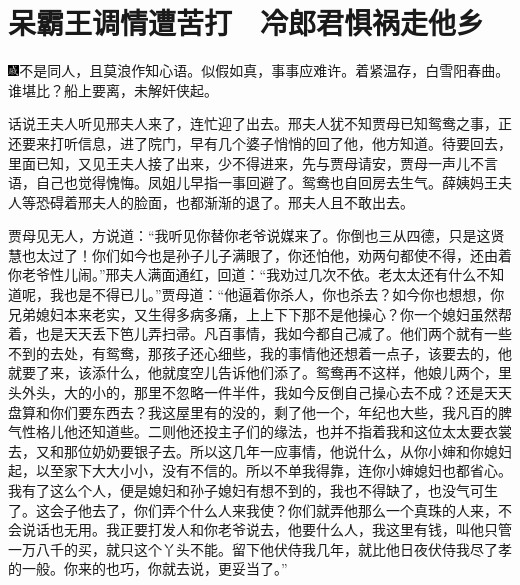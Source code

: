 

\chapter{呆霸王调情遭苦打　冷郎君惧祸走他乡}

{\includegraphics[width=3mm]{../Images/00005}不是同人，且莫浪作知心语。似假如真，事事应难许。着紧温存，白雪阳春曲。谁堪比？船上要离，未解奸侠起。}

话说王夫人听见邢夫人来了，连忙迎了出去。邢夫人犹不知贾母已知鸳鸯之事，正还要来打听信息，进了院门，早有几个婆子悄悄的回了他，他方知道。待要回去，里面已知，又见王夫人接了出来，少不得进来，先与贾母请安，贾母一声儿不言语，自己也觉得愧悔。凤姐儿早指一事回避了。鸳鸯也自回房去生气。薛姨妈王夫人等恐碍着邢夫人的脸面，也都渐渐的退了。邢夫人且不敢出去。

贾母见无人，方说道：``我听见你替你老爷说媒来了。你倒也三从四德，只是这贤慧也太过了！你们如今也是孙子儿子满眼了，你还怕他，劝两句都使不得，还由着你老爷性儿闹。''邢夫人满面通红，回道：``我劝过几次不依。老太太还有什么不知道呢，我也是不得已儿。''贾母道：``他逼着你杀人，你也杀去？如今你也想想，你兄弟媳妇本来老实，又生得多病多痛，上上下下那不是他操心？你一个媳妇虽然帮着，也是天天丢下笆儿弄扫帚。凡百事情，我如今都自己减了。他们两个就有一些不到的去处，有鸳鸯，那孩子还心细些，我的事情他还想着一点子，该要去的，他就要了来，该添什么，他就度空儿告诉他们添了。鸳鸯再不这样，他娘儿两个，里头外头，大的小的，那里不忽略一件半件，我如今反倒自己操心去不成？还是天天盘算和你们要东西去？我这屋里有的没的，剩了他一个，年纪也大些，我凡百的脾气性格儿他还知道些。二则他还投主子们的缘法，也并不指着我和这位太太要衣裳去，又和那位奶奶要银子去。所以这几年一应事情，他说什么，从你小婶和你媳妇起，以至家下大大小小，没有不信的。所以不单我得靠，连你小婶媳妇也都省心。我有了这么个人，便是媳妇和孙子媳妇有想不到的，我也不得缺了，也没气可生了。这会子他去了，你们弄个什么人来我使？你们就弄他那么一个真珠的人来，不会说话也无用。我正要打发人和你老爷说去，他要什么人，我这里有钱，叫他只管一万八千的买，就只这个丫头不能。留下他伏侍我几年，就比他日夜伏侍我尽了孝的一般。你来的也巧，你就去说，更妥当了。''

